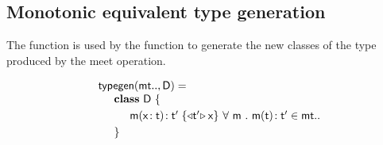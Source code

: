 \documentclass[sigconf]{acmart}
\begin{document}
\subsection{Monotonic equivalent type generation}\label{typegen}

The  function is used by the  function to generate the new classes
of the type produced by the meet operation.

\footnotesize
\[\begin{array}{l@{~}r@{}r@{~}r@{~}r@{~}rr}
\arrayrulecolor{white}
\typegen{\mt..}{\D} = \\
\SP \class~\D~\{
\\[1mm]
\SPP \Mdef\m\x\t\tp {{\MonCast\tp{\x}}} 
&
\All m \Mtype\m\t\tp\in\mt..
\\[1mm]
\SP\}
\end{array}
\]
\normalsize



\end{document}

